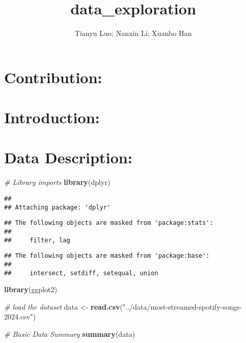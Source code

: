\documentclass[
]{article}
\title{data\_exploration}
\author{Tianyu Luo; Nanxin Li; Xuanbo Han}
\date{}
\newenvironment{Shaded}{\begin{snugshade}}{\end{snugshade}}
\newcommand{\CommentTok}[1]{\textcolor[rgb]{0.56,0.35,0.01}{\textit{#1}}}
\newcommand{\FunctionTok}[1]{\textcolor[rgb]{0.13,0.29,0.53}{\textbf{#1}}}
\newcommand{\NormalTok}[1]{#1}
\newcommand{\OtherTok}[1]{\textcolor[rgb]{0.56,0.35,0.01}{#1}}
\newcommand{\StringTok}[1]{\textcolor[rgb]{0.31,0.60,0.02}{#1}}
\begin{document}
\maketitle

\section{Contribution:}\label{contribution}

\section{Introduction:}\label{introduction}

\section{Data Description:}\label{data-description}

\begin{Shaded}
\begin{Highlighting}[]
\CommentTok{\# Library imports}
\FunctionTok{library}\NormalTok{(dplyr)}
\end{Highlighting}
\end{Shaded}

\begin{verbatim}
## 
## Attaching package: 'dplyr'
\end{verbatim}

\begin{verbatim}
## The following objects are masked from 'package:stats':
## 
##     filter, lag
\end{verbatim}

\begin{verbatim}
## The following objects are masked from 'package:base':
## 
##     intersect, setdiff, setequal, union
\end{verbatim}

\begin{Shaded}
\begin{Highlighting}[]
\FunctionTok{library}\NormalTok{(ggplot2)}

\CommentTok{\# load the dataset}
\NormalTok{data }\OtherTok{\textless{}{-}} \FunctionTok{read.csv}\NormalTok{(}\StringTok{"../data/most{-}streamed{-}spotify{-}songs{-}2024.csv"}\NormalTok{)}
\end{Highlighting}
\end{Shaded}

\begin{Shaded}
\begin{Highlighting}[]
\CommentTok{\# Basic Data Summary}
\FunctionTok{summary}\NormalTok{(data)}
\end{Highlighting}
\end{Shaded}
\end{document}
